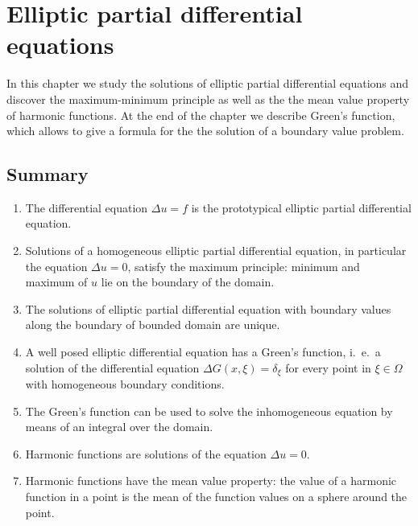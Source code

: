 %
%
%
\chapter{Elliptic partial differential equations\label{chapter-elliptisch}}
In this chapter we study the solutions of elliptic partial differential
equations and discover the maximum-minimum principle as well as the
the mean value property of harmonic functions.
At the end of the chapter we describe Green's function, which allows
to give a formula for the the solution of a boundary value problem.









\section{Summary}
\begin{enumerate}
\item
The differential equation $\Delta u=f$ is the prototypical elliptic
partial differential equation.
\item
Solutions of a homogeneous elliptic partial differential equation,
in particular the equation $\Delta u=0$, satisfy the maximum principle:
minimum and maximum of $u$ lie on the boundary of the domain.
\item
The solutions of elliptic partial differential equation with boundary
values along the boundary of bounded domain are unique.
\item
A well posed elliptic differential equation has a Green's function,
i.~e.~a solution of the differential equation
$\Delta G(x,\xi)=\delta_\xi$ for every point in $\xi\in\Omega$
with homogeneous boundary conditions.
\item
The Green's function can be used to solve the inhomogeneous equation
by means of an integral over the domain.
\item
Harmonic functions are solutions of the equation $\Delta u=0$.
\item
Harmonic functions have the mean value property: the value of a harmonic
function in a point is the mean of the function values on a sphere around
the point.
\end{enumerate}


